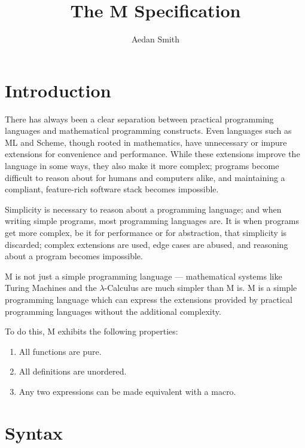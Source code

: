 \documentclass{article}
\title{The M Specification}
\author{Aedan Smith}
\begin{document}
    \maketitle
    \newpage

    \tableofcontents
    \newpage

    \section{Introduction}\label{sec:introduction}

    There has always been a clear separation between practical programming languages and mathematical programming constructs.
    Even languages such as ML and Scheme, though rooted in mathematics, have unnecessary or impure extensions for convenience and performance.
    While these extensions improve the language in some ways, they also make it more complex;
    programs become difficult to reason about for humans and computers alike, and maintaining a compliant, feature-rich software stack becomes impossible.

    Simplicity is necessary to reason about a programming language;
    and when writing simple programs, most programming languages are.
    It is when programs get more complex, be it for performance or for abstraction, that simplicity is discarded;
    complex extensions are used, edge cases are abused, and reasoning about a program becomes impossible.

    M is not just a simple programming language --- mathematical systems like Turing Machines and the $\lambda$-Calculus are much simpler than M is.
    M is a simple programming language which can express the extensions provided by practical programming languages without the additional complexity.

    To do this, M exhibits the following properties:
    \begin{enumerate}
        \item All functions are pure.
        \item All definitions are unordered.
        \item Any two expressions can be made equivalent with a macro.
    \end{enumerate}
    \newpage

    \section{Syntax}\label{sec:syntax}
\end{document}
